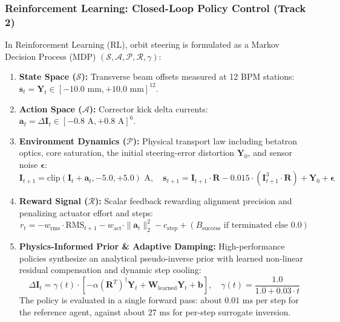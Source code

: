 \documentclass[11pt,a4paper]{article}
\begin{document}
\subsubsection{Reinforcement Learning: Closed-Loop Policy Control (Track 2)}
In Reinforcement Learning (RL), orbit steering is formulated as a Markov Decision Process (MDP) $(\mathcal{S}, \mathcal{A}, \mathcal{P}, \mathcal{R}, \gamma)$:
\begin{enumerate}
    \item \textbf{State Space ($\mathcal{S}$):} Transverse beam offsets measured at 12 BPM stations: $\mathbf{s}_t = \mathbf{Y}_t \in [-10.0\text{ mm}, +10.0\text{ mm}]^{12}$.
    \item \textbf{Action Space ($\mathcal{A}$):} Corrector kick delta currents: $\mathbf{a}_t = \Delta \mathbf{I}_t \in [-0.8\text{ A}, +0.8\text{ A}]^6$.
    \item \textbf{Environment Dynamics ($\mathcal{P}$):} Physical transport law including betatron optics, core saturation, the initial steering-error distortion $\mathbf{Y}_0$, and sensor noise $\boldsymbol{\epsilon}$:
    \begin{equation}
        \mathbf{I}_{t+1} = \text{clip}(\mathbf{I}_t + \mathbf{a}_t, -5.0, +5.0)\text{ A}, \quad \mathbf{s}_{t+1} = \mathbf{I}_{t+1} \cdot \mathbf{R} - 0.015 \cdot (\mathbf{I}_{t+1}^3 \cdot \mathbf{R}) + \mathbf{Y}_0 + \boldsymbol{\epsilon}
    \end{equation}
    \item \textbf{Reward Signal ($\mathcal{R}$):} Scalar feedback rewarding alignment precision and penalizing actuator effort and steps:
    \begin{equation}
        r_t = - w_{\text{rms}} \cdot \text{RMS}_{t+1} - w_{\text{act}} \cdot \|\mathbf{a}_t\|_2^2 - c_{\text{step}} + (B_{\text{success}} \text{ if terminated else } 0.0)
    \end{equation}
    \item \textbf{Physics-Informed Prior \& Adaptive Damping:} High-performance policies synthesize an analytical pseudo-inverse prior with learned non-linear residual compensation and dynamic step cooling:
    \begin{equation}
        \Delta \mathbf{I}_t = \gamma(t) \cdot \left[ - \alpha (\mathbf{R}^T)^\dagger \mathbf{Y}_t + \mathbf{W}_{\text{learned}} \mathbf{Y}_t + \mathbf{b} \right], \quad \gamma(t) = \frac{1.0}{1.0 + 0.03 \cdot t}
    \end{equation}
    The policy is evaluated in a single forward pass: about $0.01\text{ ms}$ per step for the reference agent, against about $27\text{ ms}$ for per-step surrogate inversion.
\end{enumerate}
\end{document}
